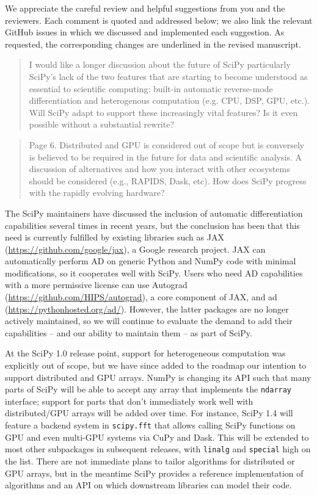 \documentclass[10pt,stdletter,dateno]{newlfm}
\begin{document}
\begin{newlfm}

We appreciate the careful review and helpful suggestions from you and the reviewers. Each comment is quoted and addressed below; we also link the relevant GitHub issues in which we discussed and implemented each suggestion. As requested, the corresponding changes are underlined in the revised manuscript.

\begin{quote}
I would like a longer discussion about the future of SciPy particularly SciPy’s lack of the two features that are starting to become understood as essential to scientific computing: built-in automatic reverse-mode differentiation and heterogenous computation (e.g. CPU, DSP, GPU, etc.). Will SciPy adapt to support these increasingly vital features? Is it even possible without a substantial rewrite?
\end{quote}

\begin{quote}
Page 6. Distributed and GPU is considered out of scope but is conversely is believed to be required in the future for data and scientific analysis. A discussion of alternatives and how you interact with other ecosystems should be considered (e.g., RAPIDS, Dask, etc). How does SciPy progress with the rapidly evolving hardware?
\end{quote}

The SciPy maintainers have discussed the inclusion of automatic differentiation capabilities several times in recent years, but the conclusion has been that this need is currently fulfilled by existing libraries such as JAX (\url{https://github.com/google/jax}), a Google research project. JAX can automatically perform AD on generic Python and NumPy code with minimal modifications, so it cooperates well with SciPy. Users who need AD capabilities with a more permissive license can use Autograd (\url{https://github.com/HIPS/autograd}), a core component of JAX, and ad (\url{https://pythonhosted.org/ad/}). However, the latter packages are no longer actively maintained, so we will continue to evaluate the demand to add their capabilities -- and our ability to maintain them -- as part of SciPy.

At the SciPy 1.0 release point, support for heterogeneous computation was explicitly out of scope, but we have since added to the roadmap our intention to support distributed and GPU arrays. NumPy is changing its API such that many parts of SciPy will be able to accept any array that implements the \texttt{ndarray} interface; support for parts that don't immediately work well with distributed/GPU arrays will be added over time. For instance, SciPy 1.4 will feature a backend system in \texttt{scipy.fft} that allows calling SciPy functions on GPU and even multi-GPU systems via CuPy and Dask. This will be extended to most other subpackages in subsequent releases, with \texttt{linalg} and \texttt{special} high on the list. There are not immediate plans to tailor algorithms for distributed or GPU arrays, but in the meantime SciPy provides a reference implementation of algorithms and an API on which downstream libraries can model their code.


\end{newlfm}
\end{document}
